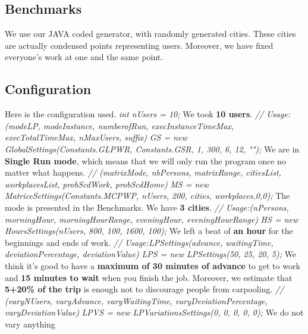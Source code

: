 \documentclass[12pt, a4paper, twoside]{memoir}
\newcommand{\newpar}{\vskip 0.2in \noindent}
\newcommand\tab[1][1cm]{\hspace*{#1}}
\begin{document}
{	\subsection{Benchmarks}
	We use our JAVA coded generator, with randomly generated cities. These cities are actually condensed points representing users. Moreover, we have fixed everyone's work at one and the same point.
	
	\subsection{Configuration}
	Here is the configuration used.
	\newpar
	\tab \textit{int nUsers = 10;}\newline
	We took \textbf{10 users}.
	\newpar
	\tab \textit{// Usage:(modeLP, modeInstance, numberofRun, execInstanceTimeMax, execTotalTimeMax, nMaxUsers, suffix)}\newline
	\tab \textit{GS = new GlobalSettings(Constants.GLPWR, Constants.GSR, 1, 300, 6, 12, "");}\newline
	We are in \textbf{Single Run mode}, which means that we will only run the program once no matter what happens.
	\newpar
	\tab \textit{// (matrixMode, nbPersons, matrixRange, citiesList, workplacesList, probScdWork, probScdHome)}\newline
	\tab \textit{MS = new MatriceSettings(Constants.MCPWP, nUsers, 200, cities, workplaces,0,0);}\newline
	The mode is presented in the Benchmarks. We have \textbf{3 cities}.
	\newpar
	\tab \textit{// Usage:(nPersons, morningHour, morningHourRange, eveningHour, eveningHourRange)}\newline
	\tab \textit{HS = new HoursSettings(nUsers, 800, 100, 1600, 100);}\newline
	We left a beat of \textbf{an hour} for the beginnings and ends of work.
	\newpar
	\tab \textit{// Usage:LPSettings(advance, waitingTime, deviationPercentage, deviationValue)}\newline
	\tab \textit{LPS = new LPSettings(50, 25, 20, 5);}\newline
	We think it's good to have a \textbf{maximum of 30 minutes of advance} to get to work and \textbf{15 minutes to wait} when you finish the job. Moreover, we estimate that \textbf{5+20\% of the trip} is enough not to discourage people from carpooling.
	\newpar
	\tab \textit{// (varyNUsers, varyAdvance, varyWaitingTime, varyDeviationPercentage, varyDeviationValue)}\newline
	\tab \textit{LPVS = new LPVariationsSettings(0, 0, 0, 0, 0);}\newline
	We do not vary anything
}
\end{document}
